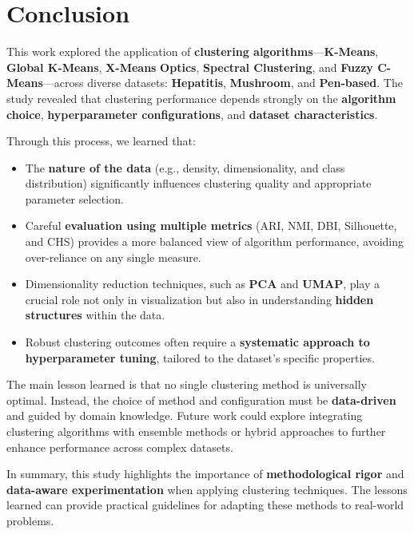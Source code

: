 \section{Conclusion}
This work explored the application of \textbf{clustering algorithms}—\textbf{K-Means}, \textbf{Global K-Means}, \textbf{X-Means} \textbf{Optics}, \textbf{Spectral Clustering}, and \textbf{Fuzzy C-Means}—across diverse datasets: \textbf{Hepatitis}, \textbf{Mushroom}, and \textbf{Pen-based}. The study revealed that clustering performance depends strongly on the \textbf{algorithm choice}, \textbf{hyperparameter configurations}, and \textbf{dataset characteristics}. 

Through this process, we learned that:
\begin{itemize}
	\item The \textbf{nature of the data} (e.g., density, dimensionality, and class distribution) significantly influences clustering quality and appropriate parameter selection.
	\item Careful \textbf{evaluation using multiple metrics} (ARI, NMI, DBI, Silhouette, and CHS) provides a more balanced view of algorithm performance, avoiding over-reliance on any single measure.
	\item Dimensionality reduction techniques, such as \textbf{PCA} and \textbf{UMAP}, play a crucial role not only in visualization but also in understanding \textbf{hidden structures} within the data.
	\item Robust clustering outcomes often require a \textbf{systematic approach to hyperparameter tuning}, tailored to the dataset's specific properties.
\end{itemize}

The main lesson learned is that no single clustering method is universally optimal. Instead, the choice of method and configuration must be \textbf{data-driven} and guided by domain knowledge. Future work could explore integrating clustering algorithms with ensemble methods or hybrid approaches to further enhance performance across complex datasets.

In summary, this study highlights the importance of \textbf{methodological rigor} and \textbf{data-aware experimentation} when applying clustering techniques. The lessons learned can provide practical guidelines for adapting these methods to real-world problems.